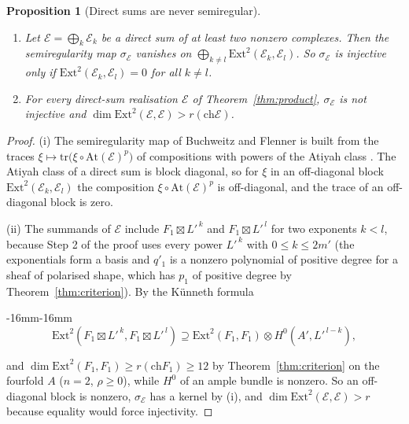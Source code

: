 \documentclass[11pt,reqno]{amsart}
\newenvironment{widetext}{\begin{adjustwidth}{-16mm}{-16mm}}{\end{adjustwidth}}
\numberwithin{equation}{section}
\theoremstyle{plain}
\newtheorem{proposition}[theorem]{Proposition}
\theoremstyle{definition}
\newcommand{\Ext}{\mathrm{Ext}}
\newcommand{\ch}{\mathrm{ch}}
\begin{document}
\begin{proposition}[Direct sums are never semiregular]\label{prop:directsum}
\leavevmode
\begin{enumerate}[label=\textup{(\roman*)},leftmargin=2.4em,itemsep=2pt]
\item Let $\mathcal{E}=\bigoplus_{k}\mathcal{E}_{k}$ be a direct sum of at least two nonzero complexes. Then the semiregularity map $\sigma_{\mathcal{E}}$ vanishes on $\bigoplus_{k\ne l}\Ext^{2}(\mathcal{E}_{k},\mathcal{E}_{l})$. So $\sigma_{\mathcal{E}}$ is injective only if $\Ext^{2}(\mathcal{E}_{k},\mathcal{E}_{l})=0$ for all $k\ne l$.
\item For every direct-sum realisation $\mathcal{E}$ of Theorem~\ref{thm:product}, $\sigma_{\mathcal{E}}$ is not injective and $\dim\Ext^{2}(\mathcal{E},\mathcal{E})>r(\ch\mathcal{E})$.
\end{enumerate}
\end{proposition}

\begin{proof}
(i) The semiregularity map of Buchweitz and Flenner is built from the traces $\xi\mapsto\mathrm{tr}\bigl(\xi\circ\mathrm{At}(\mathcal{E})^{p}\bigr)$ of compositions with powers of the Atiyah class \cite[Sect.~4]{BF03}. The Atiyah class of a direct sum is block diagonal, so for $\xi$ in an off-diagonal block $\Ext^{2}(\mathcal{E}_{k},\mathcal{E}_{l})$ the composition $\xi\circ\mathrm{At}(\mathcal{E})^{p}$ is off-diagonal, and the trace of an off-diagonal block is zero.

(ii) The summands of $\mathcal{E}$ include $F_{1}\boxtimes L'^{\,k}$ and $F_{1}\boxtimes L'^{\,l}$ for two exponents $k<l$, because Step 2 of the proof uses every power $L'^{\,k}$ with $0\le k\le2m'$ (the exponentials form a basis and $q'_{1}$ is a nonzero polynomial of positive degree for a sheaf of polarised shape, which has $p_{1}$ of positive degree by Theorem~\ref{thm:criterion}). By the K\"unneth formula
\begin{widetext}
\begin{equation}\label{eq:kunneth}
\Ext^{2}(F_{1}\boxtimes L'^{\,k},F_{1}\boxtimes L'^{\,l})\supseteq\Ext^{2}(F_{1},F_{1})\otimes H^{0}(A',L'^{\,l-k}),
\end{equation}
\end{widetext}
and $\dim\Ext^{2}(F_{1},F_{1})\ge r(\ch F_{1})\ge12$ by Theorem~\ref{thm:criterion} on the fourfold $A$ ($n=2$, $\rho\ge0$), while $H^{0}$ of an ample bundle is nonzero. So an off-diagonal block is nonzero, $\sigma_{\mathcal{E}}$ has a kernel by (i), and $\dim\Ext^{2}(\mathcal{E},\mathcal{E})>r$ because equality would force injectivity.
\end{proof}
\end{document}
